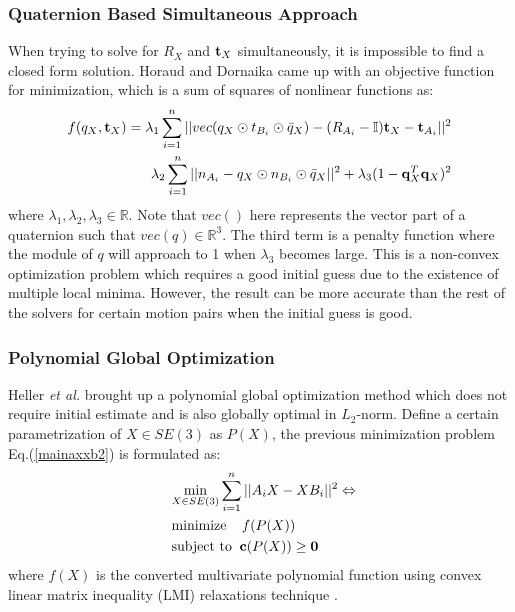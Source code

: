 \documentclass[twocolumn,10pt]{asme2ej}
\newcommand{\ttt}{{\bf t}}
\newcommand{\qq}{{\bf q}}
\begin{document}
\subsubsection{Quaternion Based Simultaneous Approach}
When trying to solve for $R_{X}$ and $\ttt_{X}$ simultaneously, it is impossible to find a closed form solution. Horaud and Dornaika \cite{horaud1995hand} came up with an objective function for minimization, which is a sum of squares of nonlinear functions as:
\begin{equation}
\begin{split}
f(q_X,\ttt_{X}) = \lambda_{1} \sum_{i = 1}^{n}||vec(q_{X} \odot t_{B_{i}} \odot \bar{q}_{X}) -(R_{A_i} - \mathbb{I})\ttt_{X} - \ttt_{A_i}||^{2}\\
\lambda_{2} \sum_{i = 1}^{n}||{n_{A_{i}} - q_{X} \odot n_{B_{i}} \odot \bar{q}_{X}}||^{2} + \lambda_{3}(1 - \qq_{X}^{T}\qq_{X})^2 
\end{split}
\label{simlqua}
\end{equation}
where $\lambda_1, \lambda_2, \lambda_3 \in \mathbb{R}$. Note that $vec()$ here represents the vector part of a quaternion such that $vec(q) \in \mathbb{R}^{3}$. The third term is a penalty function where the module of $q$ will approach to 1 when $\lambda_{3}$ becomes large. This is a non-convex optimization problem which requires a good initial guess due to the existence of multiple local minima. However, the result can be more accurate than the rest of the solvers for certain motion pairs when the initial guess is good.

\subsubsection{Polynomial Global Optimization}
Heller {\it et al.} \cite{heller2014hand} brought up a polynomial global optimization method which does not require initial estimate and is also globally optimal in $L_2$-norm.  Define a certain parametrization of $X \in SE(3)$ as $P(X)$, the previous minimization problem Eq.(\ref{mainaxxb2}) is formulated as:
\begin{equation}
\begin{split}
&\underset{X \in SE(3)}{\text{min}}\sum_{i=1}^n ||A_{i}X - XB_{i}||^2 \Leftrightarrow \\
&\text{minimize} \; \; \; \; f(P(X)) \\
\; \; &\text{subject to} \; \; {\bf c}(P(X)) \geq {\bf 0} 
\end{split}
\label{LMI}
\end{equation}
where $f(X)$ is the converted multivariate polynomial function using convex linear matrix inequality (LMI) relaxations technique \cite{lepetit2009epnp}. 
\end{document}
